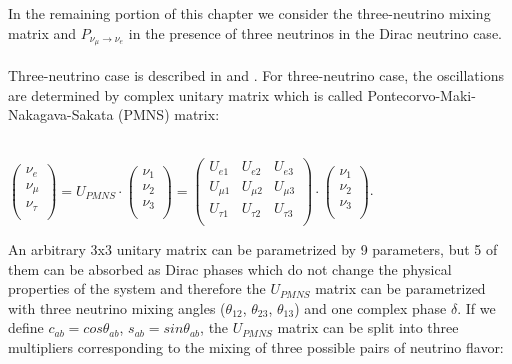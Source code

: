 In the remaining portion of this chapter we consider the three-neutrino mixing matrix and $P_{\nu_\mu \rightarrow \nu_e}$ in the presence of three neutrinos in the Dirac neutrino case.\\ \\ 
Three-neutrino case is described in \cite{ref_theory_Osc} and \cite{ref_LBNF_CDR}. For three-neutrino case, the oscillations are determined by complex unitary matrix which is called Pontecorvo-Maki-Nakagava-Sakata (PMNS) matrix:\\ \\
\begin{center}
$ \begin{pmatrix} \nu_{e} \\ \nu_{\mu} \\ \nu_{\tau} \\ \end{pmatrix}
 = U_{PMNS}\cdot \begin{pmatrix} \nu_{1} \\ \nu_{2} \\ \nu_{3} \\ \end{pmatrix} = 
 \begin{pmatrix}
  U_{e1} & U_{e2} & U_{e3} \\
  U_{\mu1} & U_{\mu2} & U_{\mu3} \\
  U_{\tau1} & U_{\tau2} & U_{\tau3} \\
 \end{pmatrix}
 \cdot
\begin{pmatrix} \nu_{1} \\ \nu_{2} \\ \nu_{3} \\ \end{pmatrix}$.\\
\end{center}
An arbitrary 3x3 unitary matrix can be parametrized by 9 parameters, but 5 of them can be absorbed as Dirac phases which do not change the physical properties of the system and therefore the $U_{PMNS}$ matrix can be parametrized with three neutrino mixing angles ($\theta_{12}$, $\theta_{23}$, $\theta_{13}$) and one complex phase $\delta$. If we define $c_{ab}=cos\theta_{ab}$, $s_{ab}=sin\theta_{ab}$, the $U_{PMNS}$ matrix can be split into three multipliers corresponding to the mixing of three possible pairs of neutrino flavor:\\ 

